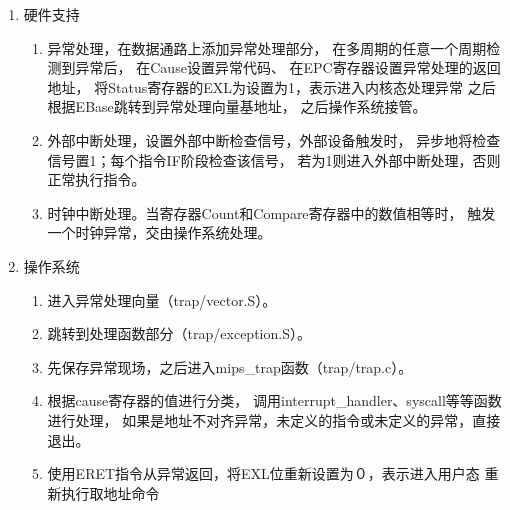             \begin{enumerate}
            \item
            硬件支持
                \begin{enumerate}
                \item
                异常处理，在数据通路上添加异常处理部分，%
                在多周期的任意一个周期检测到异常后，%
                在Cause设置异常代码、
                在EPC寄存器设置异常处理的返回地址，
                将Status寄存器的EXL为设置为1，表示进入内核态处理异常
                之后根据EBase跳转到异常处理向量基地址，%
                之后操作系统接管。
                \item
                外部中断处理，设置外部中断检查信号，外部设备触发时，%
                异步地将检查信号置1；每个指令IF阶段检查该信号，%
                若为1则进入外部中断处理，否则正常执行指令。
                \item
                时钟中断处理。当寄存器Count和Compare寄存器中的数值相等时，%
                触发一个时钟异常，交由操作系统处理。
                \end{enumerate}
            \item
            操作系统
                \begin{enumerate}
                \item
                进入异常处理向量（trap/vector.S）。
                \item
                跳转到处理函数部分（trap/exception.S）。
                \item
                先保存异常现场，之后进入mips\_trap函数（trap/trap.c）。
                \item
                根据cause寄存器的值进行分类，%
                调用interrupt\_handler、syscall等等函数进行处理，%
                如果是地址不对齐异常，未定义的指令或未定义的异常，直接退出。
                \item
                使用ERET指令从异常返回，将EXL位重新设置为０，表示进入用户态
                重新执行取地址命令
                \end{enumerate}
            \end{enumerate}

